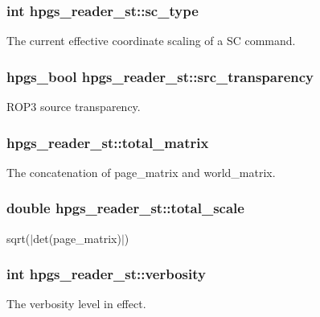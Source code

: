 \subsubsection[{sc\_\-type}]{\setlength{\rightskip}{0pt plus 5cm}int {\bf hpgs\_\-reader\_\-st::sc\_\-type}}\label{structhpgs__reader__st_a9965b2804ef11e60242cd42044fb815e}
The current effective coordinate scaling of a SC command. 
\subsubsection[{src\_\-transparency}]{\setlength{\rightskip}{0pt plus 5cm}hpgs\_\-bool {\bf hpgs\_\-reader\_\-st::src\_\-transparency}}\label{structhpgs__reader__st_aadf25c6c84c8cd6a909f62c006ea8939}
ROP3 source transparency. 
\subsubsection[{total\_\-matrix}]{ {\bf hpgs\_\-reader\_\-st::total\_\-matrix}}\label{structhpgs__reader__st_af55190b7655794319d7674c364eeebaa}
The concatenation of page\_\-matrix and world\_\-matrix. 
\subsubsection[{total\_\-scale}]{\setlength{\rightskip}{0pt plus 5cm}double {\bf hpgs\_\-reader\_\-st::total\_\-scale}}\label{structhpgs__reader__st_a02296e6401684131d808245dae6bc32b}
sqrt($|$det(page\_\-matrix)$|$) 
\subsubsection[{verbosity}]{\setlength{\rightskip}{0pt plus 5cm}int {\bf hpgs\_\-reader\_\-st::verbosity}}\label{structhpgs__reader__st_a84b00d202beed5194204a34c46121d09}
The verbosity level in effect. 

